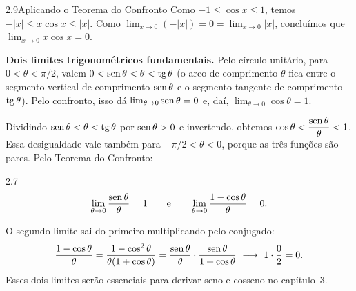 \begin{exemplo}{2.9}{Aplicando o Teorema do Confronto}
Como $-1\le\cos x\le1$, temos $-|x|\le x\cos x\le|x|$. Como $\lim_{x\to0}(-|x|)=0=
\lim_{x\to0}|x|$, concluímos que $\lim_{x\to0}x\cos x=0$.
\end{exemplo}

\textbf{Dois limites trigonométricos fundamentais.} Pelo círculo unitário, para
$0<\theta<\pi/2$, valem $0<\operatorname{sen}\theta<\theta<\operatorname{tg}\theta$ (o arco de comprimento $\theta$
fica entre o segmento vertical de comprimento $\operatorname{sen}\theta$ e o segmento tangente de
comprimento $\operatorname{tg}\theta$). Pelo confronto, isso dá $\lim_{\theta\to0}\operatorname{sen}\theta=0$ e,
daí, $\lim_{\theta\to0}\cos\theta=1$.


Dividindo $\operatorname{sen}\theta<\theta<\operatorname{tg}\theta$ por $\operatorname{sen}\theta>0$ e invertendo, obtemos
$\cos\theta<\dfrac{\operatorname{sen}\theta}{\theta}<1$. Essa desigualdade vale também para
$-\pi/2<\theta<0$, porque as três funções são pares. Pelo Teorema do Confronto:

\begin{teorema}{2.7}
\[
\lim_{\theta\to0}\frac{\operatorname{sen}\theta}{\theta}=1
\qquad\text{e}\qquad
\lim_{\theta\to0}\frac{1-\cos\theta}{\theta}=0 .
\]
\end{teorema}
O segundo limite sai do primeiro multiplicando pelo conjugado:
\[
\frac{1-\cos\theta}{\theta}=\frac{1-\cos^2\theta}{\theta(1+\cos\theta)}
=\frac{\sen\theta}{\theta}\cdot\frac{\sen\theta}{1+\cos\theta}\ \longrightarrow\ 1\cdot\frac02=0 .
\]
Esses dois limites serão essenciais para derivar seno e cosseno no capítulo~3.

